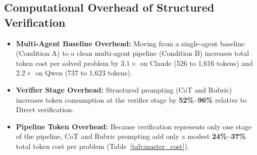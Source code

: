\documentclass[11pt]{article}
\begin{document}
\subsection{Computational Overhead of Structured Verification}
\begin{itemize}
    \item \textbf{Multi-Agent Baseline Overhead:} Moving from a single-agent baseline (Condition A) to a clean multi-agent pipeline (Condition B) increases total token cost per solved problem by \textbf{$3.1\times$} on Claude (526 to 1,616 tokens) and \textbf{$2.2\times$} on Qwen (737 to 1,623 tokens).
    \item \textbf{Verifier Stage Overhead:} Structured prompting (CoT and Rubric) increases token consumption at the verifier stage by \textbf{52\%--96\%} relative to Direct verification.
    \item \textbf{Pipeline Token Overhead:} Because verification represents only one stage of the pipeline, CoT and Rubric prompting add only a modest \textbf{24\%--37\%} total token cost per problem (Table~\ref{tab:master_cost}).
\end{itemize}
\end{document}
